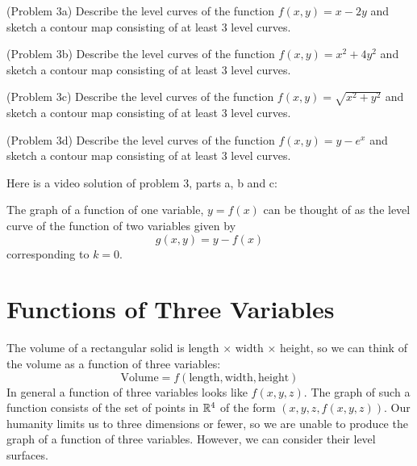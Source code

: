 \documentclass[handout]{ximera}
\begin{document}
\begin{problem}(Problem 3a)
Describe the level curves of the function $f(x,y) = x - 2y$ and sketch a contour 
map consisting of at least 3 level curves.\\
\end{problem}

\begin{problem}(Problem 3b)
Describe the level curves of the function $f(x, y) = x^2 + 4y^2$ and sketch a contour 
map consisting of at least 3 level curves.\\
\end{problem}

\begin{problem}(Problem 3c)
Describe the level curves of the function $f(x, y) = \sqrt{x^2 + y^2}$ and 
sketch a contour map consisting of at least 3 level curves.\\
\end{problem}

\begin{problem}(Problem 3d)
Describe the level curves of the function $f(x,y) = y - e^x$ and sketch a contour 
map consisting of at least 3 level curves.\\
\end{problem}

Here is a video solution of problem 3, parts a, b and c:\\

\begin{foldable}
\end{foldable}


\begin{remark}
The graph of a function of one variable, $y= f(x)$ can be thought of as the level 
curve of the function of two variables given by 
\[
g(x, y) = y-f(x)
\]
corresponding to $k = 0$.
\end{remark}




\section{Functions of Three Variables}
The volume of a rectangular solid is length $\times$ width $\times $ height, 
so we can think of the volume as a function of three variables:
\[
\mbox{Volume} = f(\mbox{length}, \mbox{width}, \mbox{height})
\]
In general a function of three variables looks like $f(x, y, z)$.
The graph of such a function consists of the set of points in $\mathbb R^4$ of the 
form $(x, y, z, f(x, y, z))$.
Our humanity limits us to three dimensions or fewer, so we are unable to produce 
the graph of a function of three variables.
However, we can consider their level surfaces.
\end{document}
